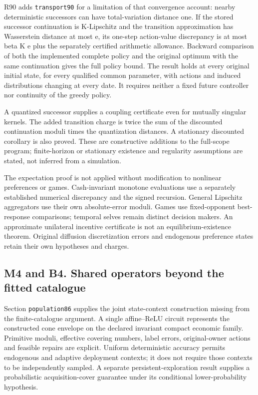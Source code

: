 R90 adds \texttt{transport90} for a limitation of that convergence
account: nearby deterministic successors can have total-variation
distance one. If the stored successor continuation is K-Lipschitz and
the transition approximation has Wasserstein distance at most e, its
one-step action-value discrepancy is at most beta K e plus the
separately certified arithmetic allowance. Backward comparison of both
the implemented complete policy and the original optimum with the same
continuation gives the full policy bound. The result holds at every
original initial state, for every qualified common parameter, with
actions and induced distributions changing at every date. It requires
neither a fixed future controller nor continuity of the greedy policy.

A quantized successor supplies a coupling certificate even for mutually
singular kernels. The added transition charge is twice the sum of the
discounted continuation moduli times the quantization distances. A
stationary discounted corollary is also proved. These are constructive
additions to the full-scope program; finite-horizon or stationary
existence and regularity assumptions are stated, not inferred from a
simulation.

The expectation proof is not applied without modification to nonlinear
preferences or games. Cash-invariant monotone evaluations use a
separately established numerical discrepancy and the signed recursion.
General Lipschitz aggregators use their own absolute-error moduli. Games
use fixed-opponent best-response comparisons; temporal selves remain
distinct decision makers. An approximate unilateral incentive
certificate is not an equilibrium-existence theorem. Original diffusion
discretization errors and endogenous preference states retain their own
hypotheses and charges.

\hypertarget{m4-and-b4.-shared-operators-beyond-the-fitted-catalogue}{%
\subsection{M4 and B4. Shared operators beyond the fitted
catalogue}\label{m4-and-b4.-shared-operators-beyond-the-fitted-catalogue}}

Section \texttt{population86} supplies the joint state-context
construction missing from the finite-catalogue argument. A single
affine--ReLU circuit represents the constructed cone envelope on the
declared invariant compact economic family. Primitive moduli, effective
covering numbers, label errors, original-owner actions and feasible
repairs are explicit. Uniform deterministic accuracy permits endogenous
and adaptive deployment contexts; it does not require those contexts to
be independently sampled. A separate persistent-exploration result
supplies a probabilistic acquisition-cover guarantee under its
conditional lower-probability hypothesis.


